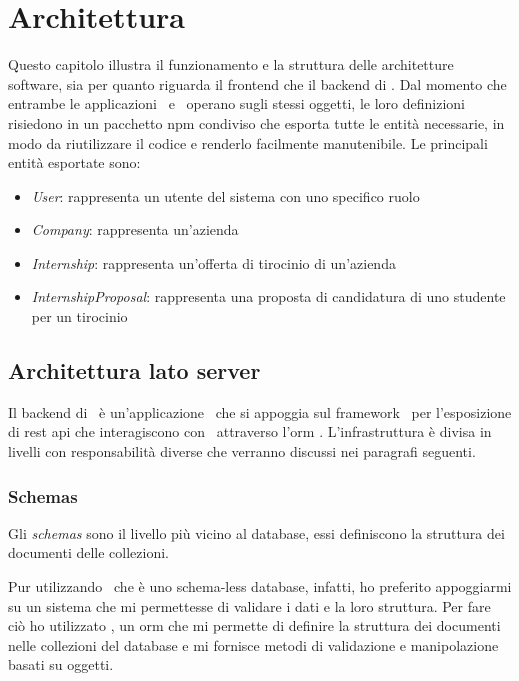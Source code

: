 \chapter{Architettura}

Questo capitolo illustra il funzionamento e la struttura delle architetture software, sia per quanto riguarda il \gls{frontend} che il \gls{backend} di \projectName. Dal momento che entrambe le applicazioni \angular~e \nodejs~operano sugli stessi oggetti, le loro definizioni risiedono in un pacchetto \gls{npm} condiviso che esporta tutte le entità necessarie, in modo da riutilizzare il codice e renderlo facilmente manutenibile. Le principali entità esportate sono:
\begin{itemize}
	\item \textit{User}: rappresenta un utente del sistema con uno specifico ruolo
	\item \textit{Company}: rappresenta un'azienda
	\item \textit{Internship}: rappresenta un'offerta di tirocinio di un'azienda
	\item \textit{InternshipProposal}: rappresenta una proposta di candidatura di uno studente per un tirocinio
\end{itemize}

\section{Architettura lato server}

Il \gls{backend} di \projectName~è un'applicazione \nodejs~che si appoggia sul \gls{framework} \expressjs~per l'esposizione di \acrshort{rest} \acrshort{api} che interagiscono con \mongodb~attraverso l'\acrshort{orm} \mongoosejs. 
L'infrastruttura è divisa in livelli con responsabilità diverse che verranno discussi nei paragrafi seguenti.

\subsection{Schemas}

Gli \textit{schemas} sono il livello più vicino al database, essi definiscono la struttura dei documenti delle collezioni.

Pur utilizzando \mongodb~che è uno schema-less database, infatti, ho preferito appoggiarmi su un sistema che mi permettesse di validare i dati e la loro struttura. Per fare ciò ho utilizzato \mongoosejs, un \gls{orm} che mi permette di definire la struttura dei documenti nelle collezioni del database e mi fornisce metodi di validazione e manipolazione basati su oggetti.

